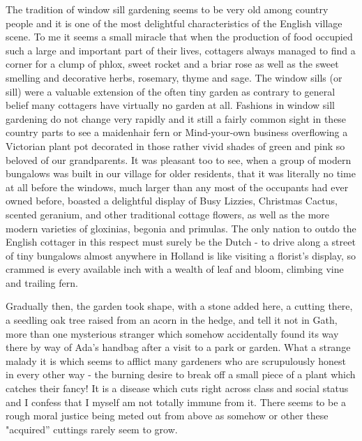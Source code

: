 The tradition of window sill gardening seems to be very old among country people and it is one of the most delightful characteristics of the English village scene. To me it seems a small miracle that when the production of food occupied such a large and important part of their lives, cottagers always managed to find a corner for a clump of phlox, sweet rocket and a briar rose as well as the sweet smelling and decorative herbs, rosemary, thyme and sage. The window sills (or sill) were a valuable extension of the often tiny garden as contrary to general belief many cottagers have virtually no garden at all. Fashions in window sill gardening do not change very rapidly and it still a fairly common sight in these country parts to see a maidenhair fern or Mind-your-own business overflowing a Victorian plant pot decorated in those rather vivid shades of green and pink so beloved of our grandparents. It was pleasant too to see, when a group of modern bungalows was built in our village for older residents, that it was literally no time at all before the windows, much larger than any most of the occupants had ever owned before, boasted a delightful display of Busy Lizzies, Christmas Cactus, scented geranium, and other traditional cottage flowers, as well as the more modern varieties of gloxinias, begonia and primulas. The only nation to outdo the English cottager in this respect must surely be the Dutch - to drive along a street of tiny bungalows almost anywhere in Holland is like visiting a florist's display, so crammed is every available inch with a wealth of leaf and bloom, climbing vine and trailing fern.

Gradually then, the garden took shape, with a stone added here, a cutting there, a seedling oak tree raised from an acorn in the hedge, and tell it not in Gath, more than one mysterious stranger which somehow accidentally found its way there by way of Ada’s handbag after a visit to a park or garden. What a strange malady it is which seems to afflict many gardeners who are scrupulously honest in every other way - the burning desire to break off a small piece of a plant which catches their fancy! It is a disease which cuts right across class and social status and I confess that I myself am not totally immune from it. There seems to be a rough moral justice being meted out from above as somehow or other these "acquired” cuttings rarely seem to grow.

